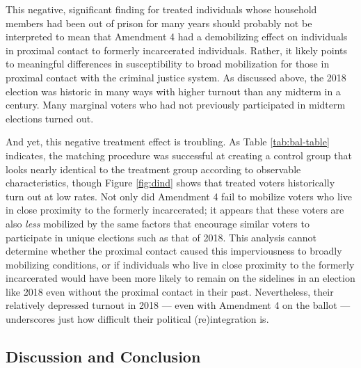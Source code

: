 \documentclass[
  12pt,
]{article}
\begin{document}
This negative, significant finding for treated individuals whose household members had been out of prison for many years should probably not be interpreted to mean that Amendment 4 had a demobilizing effect on individuals in proximal contact to formerly incarcerated individuals. Rather, it likely points to meaningful differences in susceptibility to broad mobilization for those in proximal contact with the criminal justice system. As discussed above, the 2018 election was historic in many ways with higher turnout than any midterm in a century. Many marginal voters who had not previously participated in midterm elections turned out.

And yet, this negative treatment effect is troubling. As Table \ref{tab:bal-table} indicates, the matching procedure was successful at creating a control group that looks nearly identical to the treatment group according to observable characteristics, though Figure \ref{fig:dind} shows that treated voters historically turn out at low rates. Not only did Amendment 4 fail to mobilize voters who live in close proximity to the formerly incarcerated; it appears that these voters are also \emph{less} mobilized by the same factors that encourage similar voters to participate in unique elections such as that of 2018. This analysis cannot determine whether the proximal contact caused this imperviousness to broadly mobilizing conditions, or if individuals who live in close proximity to the formerly incarcerated would have been more likely to remain on the sidelines in an election like 2018 even without the proximal contact in their past. Nevertheless, their relatively depressed turnout in 2018 --- even with Amendment 4 on the ballot --- underscores just how difficult their political (re)integration is.

\hypertarget{discussion-and-conclusion}{%
\subsection*{Discussion and Conclusion}\label{discussion-and-conclusion}}
\end{document}
